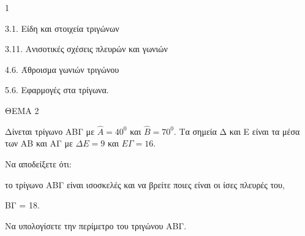 \begin{ylh}{1}
    \item 3.1. Είδη και στοιχεία τριγώνων
    \item 3.11. Ανισοτικές σχέσεις πλευρών και γωνιών
    \item 4.6. Άθροισμα γωνιών τριγώνου
    \item 5.6. Εφαρμογές στα τρίγωνα.
\end{ylh}

ΘΕΜΑ 2

Δίνεται τρίγωνο ΑΒΓ με $\widehat{Α} = 40^{0}$ και $\widehat{Β} = 70^{0}$. Τα σημεία Δ και Ε είναι τα μέσα των ΑΒ και ΑΓ με $\Delta Ε = 9$ και $Ε\Gamma = 16$.

\begin{alist}
\item Να αποδείξετε ότι:
\begin{rlist}
\item το τρίγωνο ΑΒΓ είναι ισοσκελές και να βρείτε ποιες είναι οι ίσες πλευρές του, 
\item ΒΓ = 18. 
\end{rlist}

\item Να υπολογίσετε την περίμετρο του τριγώνου ΑΒΓ. 

\begin{center}
\end{center}
\end{alist}
